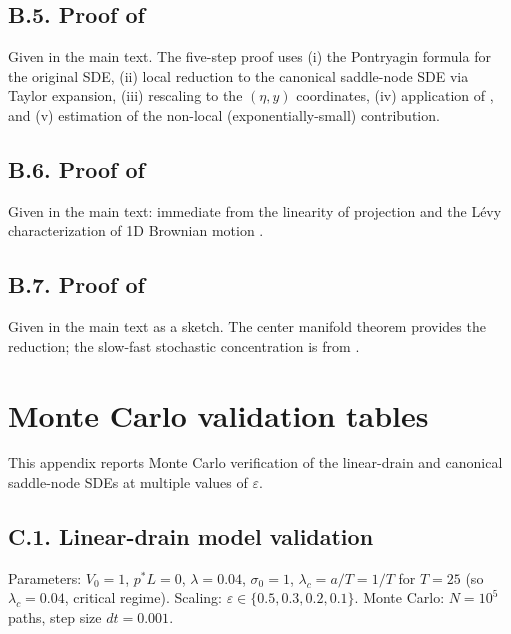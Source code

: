 \documentclass[11pt,a4paper]{article}
\theoremstyle{plain}
\theoremstyle{definition}
\newcommand{\eps}{\varepsilon}
\begin{document}
\subsection*{B.5. Proof of }

Given in the main text. The five-step proof uses (i) the Pontryagin formula for the original SDE, (ii) local reduction to the canonical saddle-node SDE via Taylor expansion, (iii) rescaling to the $(\eta, y)$ coordinates, (iv) application of , and (v) estimation of the non-local (exponentially-small) contribution.

\subsection*{B.6. Proof of }

Given in the main text: immediate from the linearity of projection and the L\'evy characterization of 1D Brownian motion \cite[Theorem 3.3.16]{KaratzasShreve1991}.

\subsection*{B.7. Proof of }

Given in the main text as a sketch. The center manifold theorem \cite[Theorem 5.1]{KuehnBook2015} provides the reduction; the slow-fast stochastic concentration is from \cite[Theorem 5.1.18]{BerglundGentz2006}.

\section{Monte Carlo validation tables}
\label{app:numerics}

This appendix reports Monte Carlo verification of the linear-drain and canonical saddle-node SDEs at multiple values of $\eps$.

\subsection*{C.1. Linear-drain model validation}

Parameters: $V_0 = 1$, $p^*L = 0$, $\lambda = 0.04$, $\sigma_0 = 1$, $\lambda_c = a/T = 1/T$ for $T = 25$ (so $\lambda_c = 0.04$, critical regime). Scaling: $\eps \in \{0.5, 0.3, 0.2, 0.1\}$. Monte Carlo: $N = 10^5$ paths, step size $dt = 0.001$.
\end{document}

